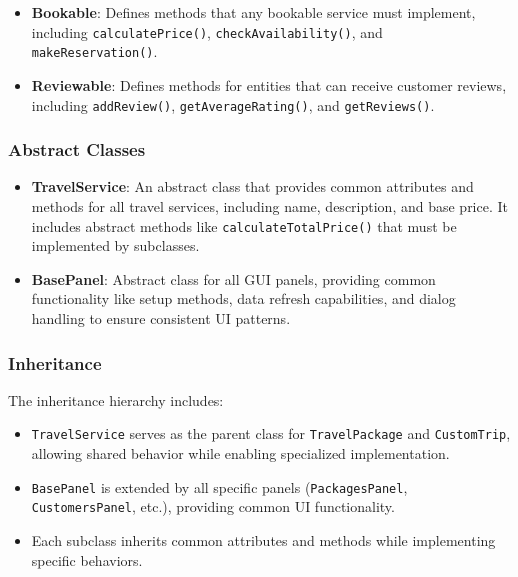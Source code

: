 \documentclass[12pt]{article}
\begin{document}
\begin{itemize}
    \item \textbf{Bookable}: Defines methods that any bookable service must implement, including \texttt{calculatePrice()}, \texttt{checkAvailability()}, and \texttt{makeReservation()}.
    
    \item \textbf{Reviewable}: Defines methods for entities that can receive customer reviews, including \texttt{addReview()}, \texttt{getAverageRating()}, and \texttt{getReviews()}.
\end{itemize}

\subsubsection{Abstract Classes}
\begin{itemize}
    \item \textbf{TravelService}: An abstract class that provides common attributes and methods for all travel services, including name, description, and base price. It includes abstract methods like \texttt{calculateTotalPrice()} that must be implemented by subclasses.
    
    \item \textbf{BasePanel}: Abstract class for all GUI panels, providing common functionality like setup methods, data refresh capabilities, and dialog handling to ensure consistent UI patterns.
\end{itemize}

\subsubsection{Inheritance}
The inheritance hierarchy includes:
\begin{itemize}
    \item \texttt{TravelService} serves as the parent class for \texttt{TravelPackage} and \texttt{CustomTrip}, allowing shared behavior while enabling specialized implementation.
    \item \texttt{BasePanel} is extended by all specific panels (\texttt{PackagesPanel}, \texttt{CustomersPanel}, etc.), providing common UI functionality.
    \item Each subclass inherits common attributes and methods while implementing specific behaviors.
\end{itemize}
\end{document}

